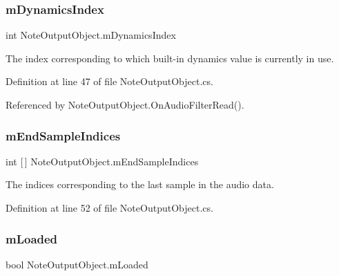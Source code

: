 \subsubsection{\texorpdfstring{m\+Dynamics\+Index}{mDynamicsIndex}}
{\footnotesize\ttfamily int Note\+Output\+Object.\+m\+Dynamics\+Index\hspace{0.3cm}{\ttfamily [private]}}



The index corresponding to which built-\/in dynamics value is currently in use. 



Definition at line 47 of file Note\+Output\+Object.\+cs.



Referenced by Note\+Output\+Object.\+On\+Audio\+Filter\+Read().

\mbox{\label{group___n_o_o_priv_var_ga48c676306790f40714072cd6a81a0128}} 
\subsubsection{\texorpdfstring{m\+End\+Sample\+Indices}{mEndSampleIndices}}
{\footnotesize\ttfamily int \mbox{[}$\,$\mbox{]} Note\+Output\+Object.\+m\+End\+Sample\+Indices\hspace{0.3cm}{\ttfamily [private]}}



The indices corresponding to the last sample in the audio data. 



Definition at line 52 of file Note\+Output\+Object.\+cs.

\mbox{\label{group___n_o_o_priv_var_gaf01d2583555de6a523cdf82808718ca9}} 
\subsubsection{\texorpdfstring{m\+Loaded}{mLoaded}}
{\footnotesize\ttfamily bool Note\+Output\+Object.\+m\+Loaded\hspace{0.3cm}{\ttfamily [private]}}



